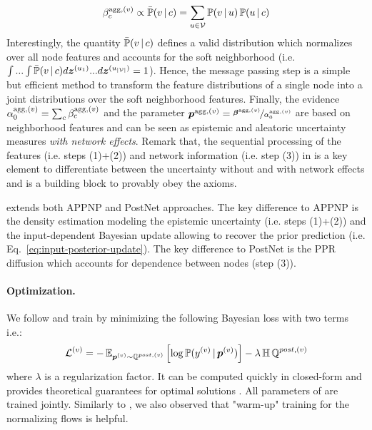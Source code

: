 \begin{equation}\label{eq:agg-evidence-density}
    \beta_c^{\text{agg}, (v)} \propto \bar{\operatorname{\mathbb{P}}}(v \,|\, c) = \sum_{u \in \mathcal{V}} \operatorname{\mathbb{P}}(v \,|\, u) \operatorname{\mathbb{P}}(u \,|\, c)
\end{equation}
Interestingly, the quantity $\bar{\operatorname{\mathbb{P}}}(v \,|\, c)$ defines a valid distribution which normalizes over all node features and accounts for the soft neighborhood (i.e. $\int...\int\bar{\operatorname{\mathbb{P}}}(v \,|\, c) d\bm{z}^{(u_1)}...d\bm{z}^{(u_{|\mathcal{V}|})} = 1$). Hence, the message passing step is a simple but efficient method to transform the feature distributions of a single node into a joint distributions over the soft neighborhood features. Finally, the evidence $\alpha_0^{\text{agg}, (v)} = \sum_c \beta_c^{\text{agg}, (v)}$ and the parameter $\bm{p}^{\text{agg}, (v)} = \nicefrac{\bm{\beta}^{\text{agg}, (v)}}{\alpha_0^{\text{agg}, (v)}}$ are based on neighborhood features and can be seen as epistemic and aleatoric uncertainty measures \emph{with network effects}. Remark that, the sequential processing of the features (i.e. steps (1)+(2)) and network information (i.e. step (3)) in \GPNacro{} is a key element to differentiate between the uncertainty without and with network effects and is a building block to provably obey the axioms.

\GPNacro{} extends both APPNP \cite{Klicpera2018} and PostNet \cite{charpentier2020} approaches. The key difference to APPNP is the density estimation modeling the epistemic uncertainty (i.e. steps (1)+(2)) and the input-dependent Bayesian update allowing to recover the prior prediction (i.e. Eq.~\ref{eq:input-posterior-update}). The key difference to PostNet is the PPR diffusion which accounts for dependence between nodes (step (3)).

\paragraph{Optimization.} We follow \cite{charpentier2020} and train \GPNacro{} by minimizing the following Bayesian loss with two terms i.e.:
\begin{equation}
    \operatorname{\mathcal{L}}^{(v)} = -\operatorname{\mathbb{E}}_{\bm{p}^{(v)}\sim \operatorname{\mathbb{Q}}^{post, (v)}}\left[\log \operatorname{\mathbb{P}}(y^{(v)} \,|\, \bm{p}^{(v)})\right] - \lambda \operatorname{\mathbb{H}}{\operatorname{\mathbb{Q}}^{post, (v)}}
\end{equation}
where $\lambda$ is a regularization factor. It can be computed quickly in closed-form and provides theoretical guarantees for optimal solutions \cite{charpentier2020}. All parameters of \GPNacro{} are trained jointly. Similarly to \cite{NatPN2021}, we also observed that "warm-up" training for the normalizing flows is helpful. 